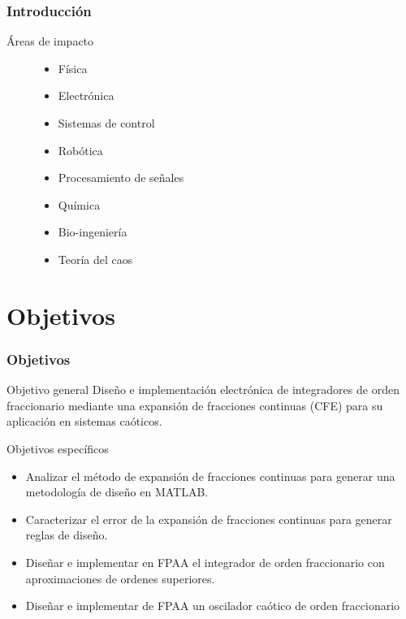 \documentclass[10pt]{beamer}
\begin{document}
	\begin{frame}
		\frametitle{Introducción}
		\begin{block}{Áreas de impacto}
		\begin{figure}[!h]
				\begin{minipage}[c]{0.48\textwidth}
					\begin{itemize}
								\justifying
								\item Física
								\item Electrónica
								\item Sistemas de control
								\item Robótica 
					\end{itemize}
				\end{minipage} \hfill \begin{minipage}[c]{0.48\textwidth}
					\begin{itemize}
								\justifying
								\item Procesamiento de señales
								\item Química
								\item Bio-ingeniería
								\item {\color{red} Teoría del caos}
					\end{itemize}
				\end{minipage}
			\end{figure}
		\end{block}
	\end{frame}		
	\section{Objetivos}
	\begin{frame}
		\frametitle{Objetivos}
		\begin{block}{Objetivo general}
		\justifying
			Diseño e implementación electrónica de integradores de orden fraccionario mediante una expansión de fracciones continuas (CFE) para su aplicación en sistemas caóticos.
		\end{block}
		
		\begin{block}{Objetivos específicos}
			\begin{itemize}
			\justifying
				\item Analizar el método de expansión de fracciones continuas para generar una metodología de diseño en MATLAB.
				\item Caracterizar el error de la expansión de fracciones continuas para generar reglas de diseño.
				\item Diseñar e implementar en FPAA el integrador de orden fraccionario con aproximaciones de ordenes superiores.
				\item Diseñar e implementar de FPAA un oscilador caótico de orden fraccionario	
			\end{itemize}
		\end{block}
	\end{frame}
\end{document}
